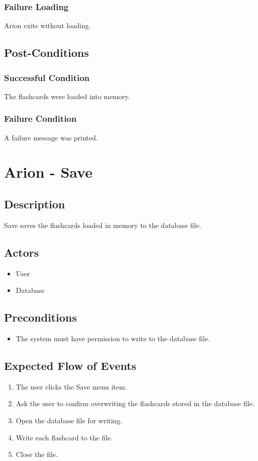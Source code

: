 \documentclass{scrreprt}
\begin{document}
    \subsection{Failure Loading}
    Arion exits without loading.

\section{Post-Conditions}
    \subsection{Successful Condition}
    The flashcards were loaded into memory.

    \subsection{Failure Condition}
    A failure message was printed.

\chapter{Arion - Save}

\section{Description}
Save saves the flashcards loaded in memory to the database file.

\section{Actors}
\begin{itemize}
    \item User
    \item Database
\end{itemize}

\section{Preconditions}
\begin{itemize}
    \item The system must have permission to write to the database file.
\end{itemize}

\section{Expected Flow of Events}
\begin{enumerate}[1.]
    \item The user clicks the Save menu item.
    \item Ask the user to confirm overwriting the flashcards stored in the database file.
    \item Open the database file for writing.
    \item Write each flashcard to the file.
    \item Close the file.
\end{enumerate}
\end{document}

